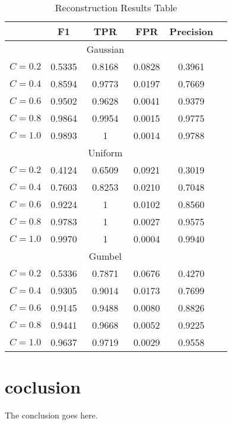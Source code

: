 \documentclass[journal]{IEEEtran}
\begin{document}
{		
	\begin{table}[tbp]
		\caption{Reconstruction Results Table}
		\begin{center}
			\begin{tabular*}{8cm}{@{\extracolsep{\fill}}lccccc}
				\hline\hline
				& F1 & TPR & FPR & Precision  \\ 
				\hline\hline
				& & Gaussian & &\\
				$C=0.2$ & 0.5335 & 0.8168 & 0.0828 & 0.3961 \\
				$C=0.4$ & 0.8594 & 0.9773 & 0.0197 & 0.7669 \\
				$C=0.6$ & 0.9502 & 0.9628 & 0.0041 & 0.9379 \\
				$C=0.8$ & 0.9864 & 0.9954 & 0.0015 & 0.9775 \\
				$C=1.0$ & 0.9893 & 1      & 0.0014 & 0.9788 \\
				\hline\hline
				& & Uniform & &\\
				$C=0.2$ & 0.4124 & 0.6509 & 0.0921 & 0.3019 \\
				$C=0.4$ & 0.7603 & 0.8253 & 0.0210 & 0.7048 \\
				$C=0.6$ & 0.9224 & 1      & 0.0102 & 0.8560 \\
				$C=0.8$ & 0.9783 & 1      & 0.0027 & 0.9575 \\
				$C=1.0$ & 0.9970 & 1      & 0.0004 & 0.9940 \\
				\hline\hline
				& & Gumbel & &\\
				$C=0.2$ & 0.5336 & 0.7871 & 0.0676 & 0.4270 \\
				$C=0.4$ & 0.9305 & 0.9014 & 0.0173 & 0.7699 \\
				$C=0.6$ & 0.9145 & 0.9488 & 0.0080 & 0.8826 \\
				$C=0.8$ & 0.9441 & 0.9668 & 0.0052 & 0.9225 \\
				$C=1.0$ & 0.9637 & 0.9719 & 0.0029 & 0.9558 \\
				\hline\hline
			\end{tabular*}
		\end{center}
	\end{table}
		
	\section{coclusion}
	The conclusion goes here.
	
}
\end{document}
